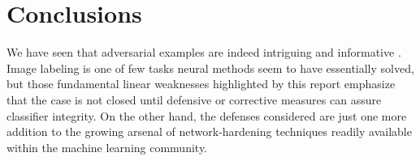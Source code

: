 \documentclass[conference]{IEEEtran}
\begin{document}
\section{Conclusions}

We have seen that adversarial examples are indeed intriguing and informative 
\cite{szegedy2014intriguing}. Image labeling is one of few tasks neural
methods seem to have essentially solved, but those fundamental linear
weaknesses highlighted by this report emphasize that the case is not closed
until defensive or corrective measures can assure classifier integrity. On
the other hand, the defenses considered are just one more addition to the
growing arsenal of network-hardening techniques readily available within the
machine learning community.



\end{document}
